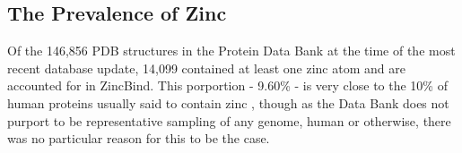 \subsection{The Prevalence of Zinc}

Of the 146,856 PDB structures in the Protein Data Bank at the time of the most recent database update, 14,099 contained at least one zinc atom and are accounted for in ZincBind. This porportion - 9.60\% - is very close to the 10\% of human proteins usually said to contain zinc , though as the Data Bank does not purport to be representative sampling of any genome, human or otherwise, there was no particular reason for this to be the case.